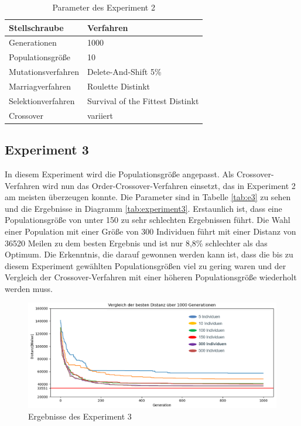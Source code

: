 \begin{table}[H]
\centering
\caption{Parameter des Experiment 2}
\begin{tabular}{ll}
Stellschraube & Verfahren \\
\hline
Generationen & 1000 \\
Populationsgröße & 10 \\
Mutationsverfahren & Delete-And-Shift 5\% \\
Marriagverfahren & Roulette Distinkt \\
Selektionverfahren & Survival of the Fittest Distinkt \\
Crossover & variiert
\end{tabular}
\label{tab:e2}
\end{table}

\subsection{Experiment 3}
In diesem Experiment wird die Populationsgröße angepasst. Als Crossover-Verfahren wird nun das Order-Crossover-Verfahren einsetzt, das in Experiment 2 am meisten überzeugen konnte.
Die Parameter sind in Tabelle \ref{tab:e3} zu sehen und die Ergebnisse in Diagramm \ref{tab:experiment3}. Erstaunlich ist, dass eine Populationsgröße von unter 150 zu sehr schlechten Ergebnissen führt. Die Wahl einer Population mit einer Größe von 300 Individuen führt mit einer Distanz von 36520 Meilen zu dem besten Ergebnis und ist nur 8,8\% schlechter als das Optimum. Die Erkenntnis, die darauf gewonnen werden kann ist, dass die bis zu diesem Experiment gewählten Populationsgrößen viel zu gering waren und der Vergleich der Crossover-Verfahren mit einer höheren Populationsgröße wiederholt werden muss.

\begin{figure}[H]
\centering
\includegraphics[width=1\textwidth]{img/Vortrag/experiment3.png}
\caption{Ergebnisse des Experiment 3}
\label{fig:experiment3}
\end{figure}

